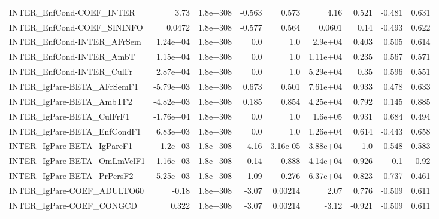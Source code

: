 \begin{tabular}{lrrrrrrrr}
INTER\_EnfCond-COEF\_INTER              &        3.73 &     1.8e+308 &  -0.563 &    0.573 &       4.16 &       0.521 &       -0.481 &         0.631 \\
INTER\_EnfCond-COEF\_SININFO            &      0.0472 &     1.8e+308 &  -0.577 &    0.564 &     0.0601 &        0.14 &       -0.493 &         0.622 \\
INTER\_EnfCond-INTER\_AFrSem            &    1.24e+04 &     1.8e+308 &     0.0 &      1.0 &    2.9e+04 &       0.403 &        0.505 &         0.614 \\
INTER\_EnfCond-INTER\_AmbT              &    1.15e+04 &     1.8e+308 &     0.0 &      1.0 &   1.11e+04 &       0.235 &        0.567 &         0.571 \\
INTER\_EnfCond-INTER\_CulFr             &    2.87e+04 &     1.8e+308 &     0.0 &      1.0 &   5.29e+04 &        0.35 &        0.596 &         0.551 \\
INTER\_IgPare-BETA\_AFrSemF1            &   -5.79e+03 &     1.8e+308 &   0.673 &    0.501 &   7.61e+04 &       0.933 &        0.478 &         0.633 \\
INTER\_IgPare-BETA\_AmbTF2              &   -4.82e+03 &     1.8e+308 &   0.185 &    0.854 &   4.25e+04 &       0.792 &        0.145 &         0.885 \\
INTER\_IgPare-BETA\_CulFrF1             &   -1.76e+04 &     1.8e+308 &     0.0 &      1.0 &    1.6e+05 &       0.931 &        0.684 &         0.494 \\
INTER\_IgPare-BETA\_EnfCondF1           &    6.83e+03 &     1.8e+308 &     0.0 &      1.0 &   1.26e+04 &       0.614 &       -0.443 &         0.658 \\
INTER\_IgPare-BETA\_IgPareF1            &     1.2e+03 &     1.8e+308 &   -4.16 & 3.16e-05 &   3.88e+04 &         1.0 &       -0.548 &         0.583 \\
INTER\_IgPare-BETA\_OmLmVelF1           &   -1.16e+03 &     1.8e+308 &    0.14 &    0.888 &   4.14e+04 &       0.926 &          0.1 &          0.92 \\
INTER\_IgPare-BETA\_PrPersF2            &   -5.25e+03 &     1.8e+308 &    1.09 &    0.276 &   6.37e+04 &       0.823 &        0.737 &         0.461 \\
INTER\_IgPare-COEF\_ADULTO60            &       -0.18 &     1.8e+308 &   -3.07 &  0.00214 &       2.07 &       0.776 &       -0.509 &         0.611 \\
INTER\_IgPare-COEF\_CONGCD              &       0.322 &     1.8e+308 &   -3.07 &  0.00214 &      -3.12 &      -0.921 &       -0.509 &         0.611 \\

\end{tabular}
